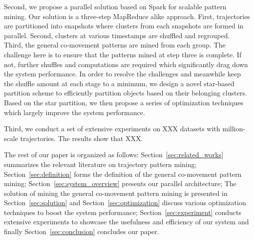  
Second, we propose a parallel solution based on Spark for scalable pattern mining. Our
solution is a three-step MapReduce alike approach. First, trajectories are partitioned
into snapshots where clusters from each snapshots are formed in parallel. Second, 
clusters at various timestamps are shuffled and regrouped. Third, the general co-movement patterns
are mined from each group. The challenge here is to ensure that
the patterns mined at step three is complete. If not, further shuffles and computations are required which 
significantly drag down the system performance. In order to resolve the challenges and meanwhile keep the 
shuffle amount at each stage to a minimum, 
we design a novel star-based partition scheme to efficiently partition objects based on their
belonging clusters. Based on the star partition, we then propose a series of optimization techniques which
largely improve the system performance.

Third, we conduct a set of extensive experiments on XXX datasets with million-scale trajectories. The results show that XXX.

The rest of our paper is organized as follows: Section~\ref{sec:related_works} summarizes the relevant literature on 
trajectory pattern mining; Section~\ref{sec:definition} forms the definition of the general co-movement pattern mining; Section~\ref{sec:system_overview} presents our parallel architecture; The solution of mining the general co-movement pattern mining is presented in Section~\ref{sec:solution} and Section~\ref{sec:optimization} discuss various optimization techniques to boost the system performance; Section~\ref{sec:experiment} conducts extensive experiments to showcase the usefulness and efficiency of our system and finally Section~\ref{sec:conclusion} concludes our paper.


